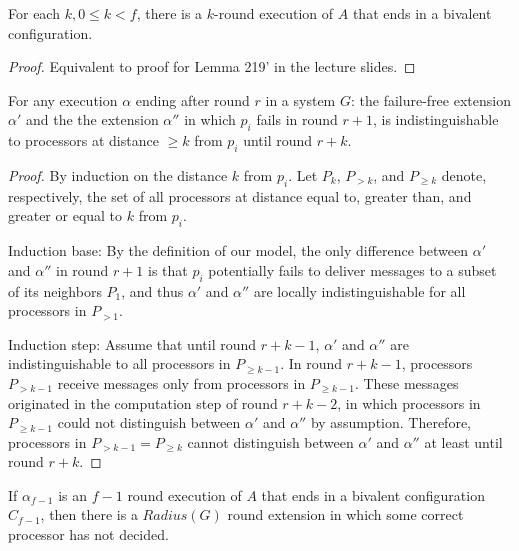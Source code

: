 \begin{lemma}
For each $k, 0 \leq k < f$, there is a $k$-round execution of $A$ that ends in
a bivalent configuration.
\end{lemma}

\begin{proof}
Equivalent to proof for Lemma 219' in the lecture slides.
\end{proof}

\begin{lemma} \label{lemma:indist_dist}
For any execution $\alpha$ ending after round $r$ in a system $G$: the failure-free
extension $\alpha'$ and the the extension $\alpha''$ in which $p_i$ fails in round $r+1$,
is indistinguishable to processors at distance $\geq k$ from $p_i$ until round $r+k$.
\end{lemma}

\begin{proof}
By induction on the distance $k$ from $p_i$. Let $P_k$, $P_{>k}$, and $P_{\geq k}$ denote,
respectively, the set of all processors at distance equal to, greater than, and
greater or equal to $k$ from $p_i$.

Induction base: By the definition of our model, the only difference 
between $\alpha'$ and $\alpha''$ in round $r+1$ is that $p_i$ potentially fails
to deliver messages to a subset of its neighbors $P_1$, and thus $\alpha'$ and $\alpha''$
are locally indistinguishable for all processors in $P_{>1}$.

Induction step: Assume that until round $r+k-1$, $\alpha'$ and $\alpha''$ are
indistinguishable to all processors in $P_{\geq k-1}$. In round $r+k-1$, processors
$P_{>k-1}$ receive messages only from processors in $P_{\geq k-1}$. These messages
originated in the computation step of round $r+k-2$, in which processors in $P_{\geq k-1}$
could not distinguish between $\alpha'$ and $\alpha''$ by assumption.
Therefore, processors in $P_{>k-1} = P_{\geq k}$ cannot distinguish between
$\alpha'$ and $\alpha''$ at least until round $r+k$.
\end{proof}


\begin{lemma}
If $\alpha_{f-1}$ is an $f-1$ round execution of $A$ that ends in a bivalent
configuration $C_{f-1}$, then there is a $Radius(G)$ round extension in which
some correct processor has not decided.
\end{lemma}

